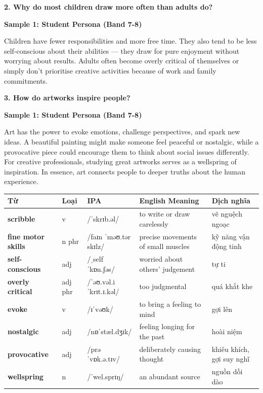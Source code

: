 \begin{ieltsquestion}
\textbf{2. Why do most children draw more often than adults do?}
\end{ieltsquestion}
\textbf{Sample 1: Student Persona (Band 7-8)}

Children have fewer responsibilities and more free time. They also tend to be less self-conscious about their abilities — they draw for pure enjoyment without worrying about results. Adults often become overly critical of themselves or simply don't prioritise creative activities because of work and family commitments.

\separator

\begin{ieltsquestion}
\textbf{3. How do artworks inspire people?}
\end{ieltsquestion}
\textbf{Sample 1: Student Persona (Band 7-8)}

Art has the power to evoke emotions, challenge perspectives, and spark new ideas. A beautiful painting might make someone feel peaceful or nostalgic, while a provocative piece could encourage them to think about social issues differently. For creative professionals, studying great artworks serves as a wellspring of inspiration. In essence, art connects people to deeper truths about the human experience.

\separator


\vspace{0.8em}
\begin{center}
\renewcommand{\arraystretch}{1.65}
\begin{tabularx}{\textwidth}{|V{0.22\textwidth}|C{0.07\textwidth}|I{0.20\textwidth}|Y|V{0.18\textwidth}|}
\hline
{}
\textbf{Từ} & \textbf{Loại} & \textbf{IPA} & \textbf{English Meaning} & \textbf{Dịch nghĩa} \\
\hline
\textbf{scribble} & v & /ˈskrɪb.əl/ & to write or draw carelessly & vẽ nguệch ngoạc \\ \hline
\textbf{fine motor skills} & n phr & /faɪn ˈməʊ.tər skɪlz/ & precise movements of small muscles & kỹ năng vận động tinh \\ \hline
\textbf{self-conscious} & adj & /ˌself ˈkɒn.ʃəs/ & worried about others' judgement & tự ti \\ \hline
\textbf{overly critical} & adj phr & /ˈəʊ.vəl.i ˈkrɪt.ɪ.kəl/ & too judgmental & quá khắt khe \\ \hline
\textbf{evoke} & v & /ɪˈvəʊk/ & to bring a feeling to mind & gợi lên \\ \hline
\textbf{nostalgic} & adj & /nɒˈstæl.dʒɪk/ & feeling longing for the past & hoài niệm \\ \hline
\textbf{provocative} & adj & /prəˈvɒk.ə.tɪv/ & deliberately causing thought & khiêu khích, gợi suy nghĩ \\ \hline
\textbf{wellspring} & n & /ˈwel.sprɪŋ/ & an abundant source & nguồn dồi dào \\ \hline
\end{tabularx}
\end{center}

\newpage

